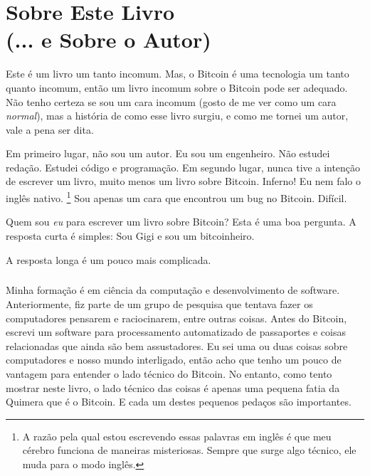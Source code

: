 
\def\bitcoinB{\leavevmode
  {\setbox0=\hbox{\textsf{B}}%
    \dimen0\ht0 \advance\dimen0 0.2ex
    \ooalign{\hfil \box0\hfil\cr
      \hfil\vrule height \dimen0 depth.2ex\hfil\cr
    }%
  }%
}

\chapter*{Sobre Este Livro \\ (... e Sobre o Autor)}

Este é um livro um tanto incomum. Mas, o Bitcoin é uma tecnologia um tanto quanto incomum, então um livro incomum sobre o Bitcoin pode ser adequado. Não tenho certeza se sou um cara incomum (gosto de me ver como um cara \textit {normal}), mas a história de como esse livro surgiu, e como me tornei um autor, vale a pena ser dita.

Em primeiro lugar, não sou um autor. Eu sou um engenheiro. Não estudei redação. Estudei código e programação. Em segundo lugar, nunca tive a intenção de escrever um livro, muito menos um livro sobre Bitcoin. Inferno! Eu nem falo o inglês nativo. \footnote{A razão pela qual estou escrevendo essas palavras em inglês é que meu cérebro funciona de maneiras misteriosas. Sempre que surge algo técnico, ele muda para o modo inglês.} Sou apenas um cara que encontrou um bug no Bitcoin. Difícil.

Quem sou \textit {eu} para escrever um livro sobre Bitcoin? Esta é uma boa pergunta. A resposta curta é simples: Sou Gigi e sou um bitcoinheiro.

A resposta longa é um pouco mais complicada.

\paragraph{}
Minha formação é em ciência da computação e desenvolvimento de software. Anteriormente, fiz parte de um grupo de pesquisa que tentava fazer os computadores pensarem e raciocinarem, entre outras coisas. Antes do Bitcoin, escrevi um software para processamento automatizado de passaportes e coisas relacionadas que ainda são bem assustadores. Eu sei uma ou duas coisas sobre computadores e nosso mundo interligado, então acho que tenho um pouco de vantagem para entender o lado técnico do Bitcoin. No entanto, como tento mostrar neste livro, o lado técnico das coisas é apenas uma pequena fatia da Quimera que é o Bitcoin. E cada um destes pequenos pedaços são importantes.

